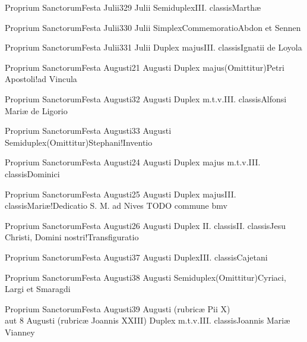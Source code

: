 \documentclass[psalterium-feriale.tex]{subfiles}
\begin{document}
	{Proprium Sanctorum}{Festa Julii}{3}{29 Julii}
	{Semiduplex}{III. classis}{Marthæ}
	{}
	{}

	{Proprium Sanctorum}{Festa Julii}{3}{30 Julii}
	{Simplex}{Commemoratio}{Abdon et Sennen}
	{}
	{\invitferia}

	{Proprium Sanctorum}{Festa Julii}{3}{31 Julii}
	{Duplex majus}{III. classis}{Ignatii de Loyola}
	{}
	{}

	{Proprium Sanctorum}{Festa Augusti}{2}{1 Augusti}
	{Duplex majus}{(Omittitur)}{Petri Apostoli!ad Vincula}
	{}
	{}
\psalmodiapropria

	{Proprium Sanctorum}{Festa Augusti}{3}{2 Augusti}
	{Duplex m.t.v.}{III. classis}{Alfonsi Mariæ de Ligorio}
	{}
	{}

	{Proprium Sanctorum}{Festa Augusti}{3}{3 Augusti}
	{Semiduplex}{(Omittitur)}{Stephani!Inventio}
	{}
	{}

	{Proprium Sanctorum}{Festa Augusti}{2}{4 Augusti}
	{Duplex majus m.t.v.}{III. classis}{Dominici}
	{}
	{}

	{Proprium Sanctorum}{Festa Augusti}{2}{5 Augusti}
	{Duplex majus}{III. classis}{Mariæ!Dedicatio S. M. ad Nives}
	{\psalmodiapropria}
	{TODO commune bmv}

	{Proprium Sanctorum}{Festa Augusti}{2}{6 Augusti}
	{Duplex II. classis}{II. classis}{Jesu Christi, Domini nostri!Transfiguratio}
	{}
	{}
\psalmodiapropria

	{Proprium Sanctorum}{Festa Augusti}{3}{7 Augusti}
	{Duplex}{III. classis}{Cajetani}
	{}
	{}

	{Proprium Sanctorum}{Festa Augusti}{3}{8 Augusti}
	{Semiduplex}{(Omittitur)}{Cyriaci, Largi et Smaragdi}
	{}
	{}

	{Proprium Sanctorum}{Festa Augusti}{3}{9 Augusti (rubricæ Pii X)\\aut 8 Augusti (rubricæ Joannis XXIII)}
	{Duplex m.t.v.}{III. classis}{Joannis Mariæ Vianney}
	{}
	{}
\end{document}
